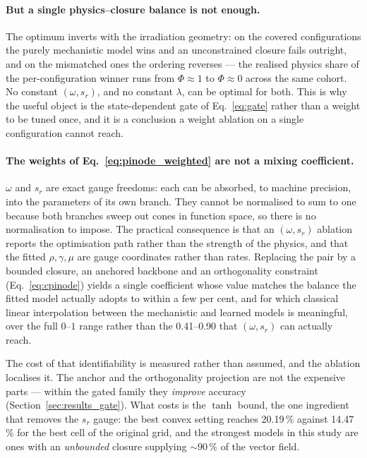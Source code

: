 \paragraph{But a single physics--closure balance is not enough.} The optimum
inverts with the irradiation geometry: on the covered configurations the purely
mechanistic model wins and an unconstrained closure fails outright, and on the
mismatched ones the ordering reverses --- the realised physics share of the
per-configuration winner runs from $\Phi\approx1$ to $\Phi\approx0$ across the
same cohort. No constant $(\omega,s_{r})$, and no constant $\lambda$, can be
optimal for both. This is why the useful object is the state-dependent gate of
Eq.~\eqref{eq:gate} rather than a weight to be tuned once, and it is a
conclusion a weight ablation on a single configuration cannot reach.

\paragraph{The weights of Eq.~\eqref{eq:pinode_weighted} are not a mixing
coefficient.} $\omega$ and $s_{r}$ are exact gauge freedoms: each can be
absorbed, to machine precision, into the parameters of its own branch. They
cannot be normalised to sum to one because both branches sweep out cones in
function space, so there is no normalisation to impose. The practical
consequence is that an $(\omega,s_{r})$ ablation reports the optimisation path
rather than the strength of the physics, and that the fitted $\rho,\gamma,\mu$
are gauge coordinates rather than rates. Replacing the pair by a bounded
closure, an anchored backbone and an orthogonality constraint
(Eq.~\eqref{eq:cpinode}) yields a single coefficient whose value matches the
balance the fitted model actually adopts to within a few per cent, and for which
classical linear interpolation between the mechanistic and learned models is
meaningful, over the full $0$--$1$ range rather than the
0.41--0.90 that $(\omega,s_{r})$ can actually reach.

The cost of that identifiability is measured rather than assumed, and the
ablation localises it. The anchor and the orthogonality projection are not the
expensive parts --- within the gated family they \emph{improve} accuracy
(Section~\ref{sec:results_gate}). What costs is the $\tanh$ bound, the one
ingredient that removes the $s_{r}$ gauge: the best convex setting reaches
20.19\,\% against 14.47\,\% for the best cell of the original
grid, and the strongest models in this study are ones with an \emph{unbounded}
closure supplying $\sim90\,\%$ of the vector field.

